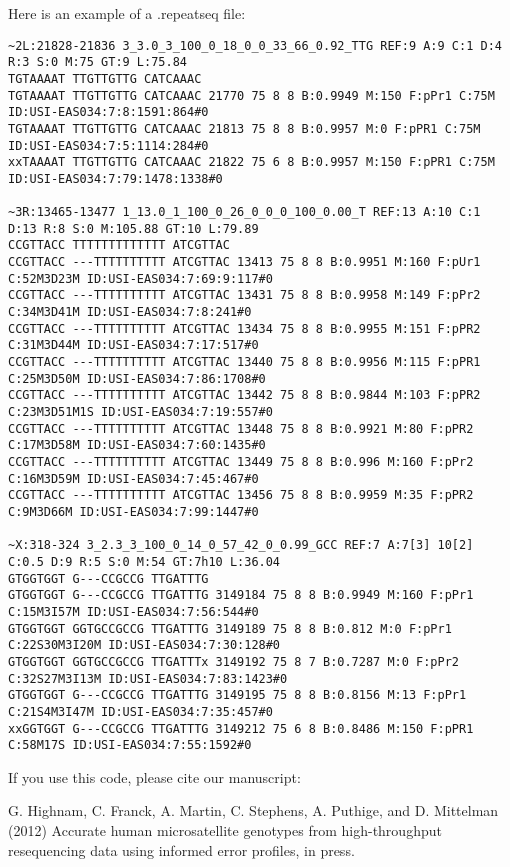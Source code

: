 \documentclass[11pt]{article}
\begin{document}
Here is an example of a .repeatseq file:
\begin{verbatim}
~2L:21828-21836 3_3.0_3_100_0_18_0_0_33_66_0.92_TTG REF:9 A:9 C:1 D:4 R:3 S:0 M:75 GT:9 L:75.84
TGTAAAAT TTGTTGTTG CATCAAAC
TGTAAAAT TTGTTGTTG CATCAAAC 21770 75 8 8 B:0.9949 M:150 F:pPr1 C:75M ID:USI-EAS034:7:8:1591:864#0
TGTAAAAT TTGTTGTTG CATCAAAC 21813 75 8 8 B:0.9957 M:0 F:pPR1 C:75M ID:USI-EAS034:7:5:1114:284#0
xxTAAAAT TTGTTGTTG CATCAAAC 21822 75 6 8 B:0.9957 M:150 F:pPR1 C:75M ID:USI-EAS034:7:79:1478:1338#0

~3R:13465-13477 1_13.0_1_100_0_26_0_0_0_100_0.00_T REF:13 A:10 C:1 D:13 R:8 S:0 M:105.88 GT:10 L:79.89
CCGTTACC TTTTTTTTTTTTT ATCGTTAC
CCGTTACC ---TTTTTTTTTT ATCGTTAC 13413 75 8 8 B:0.9951 M:160 F:pUr1 C:52M3D23M ID:USI-EAS034:7:69:9:117#0
CCGTTACC ---TTTTTTTTTT ATCGTTAC 13431 75 8 8 B:0.9958 M:149 F:pPr2 C:34M3D41M ID:USI-EAS034:7:8:241#0
CCGTTACC ---TTTTTTTTTT ATCGTTAC 13434 75 8 8 B:0.9955 M:151 F:pPR2 C:31M3D44M ID:USI-EAS034:7:17:517#0
CCGTTACC ---TTTTTTTTTT ATCGTTAC 13440 75 8 8 B:0.9956 M:115 F:pPR1 C:25M3D50M ID:USI-EAS034:7:86:1708#0
CCGTTACC ---TTTTTTTTTT ATCGTTAC 13442 75 8 8 B:0.9844 M:103 F:pPR2 C:23M3D51M1S ID:USI-EAS034:7:19:557#0
CCGTTACC ---TTTTTTTTTT ATCGTTAC 13448 75 8 8 B:0.9921 M:80 F:pPR2 C:17M3D58M ID:USI-EAS034:7:60:1435#0
CCGTTACC ---TTTTTTTTTT ATCGTTAC 13449 75 8 8 B:0.996 M:160 F:pPr2 C:16M3D59M ID:USI-EAS034:7:45:467#0
CCGTTACC ---TTTTTTTTTT ATCGTTAC 13456 75 8 8 B:0.9959 M:35 F:pPR2 C:9M3D66M ID:USI-EAS034:7:99:1447#0

~X:318-324 3_2.3_3_100_0_14_0_57_42_0_0.99_GCC REF:7 A:7[3] 10[2] C:0.5 D:9 R:5 S:0 M:54 GT:7h10 L:36.04
GTGGTGGT G---CCGCCG TTGATTTG
GTGGTGGT G---CCGCCG TTGATTTG 3149184 75 8 8 B:0.9949 M:160 F:pPr1 C:15M3I57M ID:USI-EAS034:7:56:544#0
GTGGTGGT GGTGCCGCCG TTGATTTG 3149189 75 8 8 B:0.812 M:0 F:pPr1 C:22S30M3I20M ID:USI-EAS034:7:30:128#0
GTGGTGGT GGTGCCGCCG TTGATTTx 3149192 75 8 7 B:0.7287 M:0 F:pPr2 C:32S27M3I13M ID:USI-EAS034:7:83:1423#0
GTGGTGGT G---CCGCCG TTGATTTG 3149195 75 8 8 B:0.8156 M:13 F:pPr1 C:21S4M3I47M ID:USI-EAS034:7:35:457#0
xxGGTGGT G---CCGCCG TTGATTTG 3149212 75 6 8 B:0.8486 M:150 F:pPR1 C:58M17S ID:USI-EAS034:7:55:1592#0
\end{verbatim}

If you use this code, please cite our manuscript:

G. Highnam, C. Franck, A. Martin, C. Stephens, A. Puthige, and D. Mittelman (2012) Accurate human microsatellite genotypes from high-throughput resequencing data using informed error profiles, in press.
\end{document}
